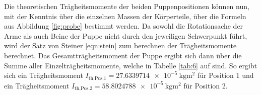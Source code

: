 Die theoretischen Trägheitsmomente der beiden Puppenpositionen können nun, mit der Kenntnis über die einzelnen Massen der Körperteile, über die Formeln aus Abbildung \ref{fig:probe} bestimmt werden. 
Da sowohl die Rotationsache der Arme als auch Beine der Puppe nicht durch den jeweiligen Schwerpunkt führt, wird der Satz von Steiner
\eqref{eqn:stein} zum berechnen der Trägheitsmomente berechnet. Das Gesamtträgheitsmoment der Puppe ergibt sich dann über die Summe aller Einzelträgheitsmomente, welche in Tabelle \ref{tab:6} auf sind.
So ergibt sich ein Trägheitsmoment $I_{\text{th,Pos.1}}=\SI{27.6339714e-5}{\kilo\gram\square\m}$ für Position 1 und ein Trägheitsmoment
$I_{\text{th,Pos.2}}=\SI{58.8024788e-5}{\kilo\gram\square\m}$ für Position 2.
%
